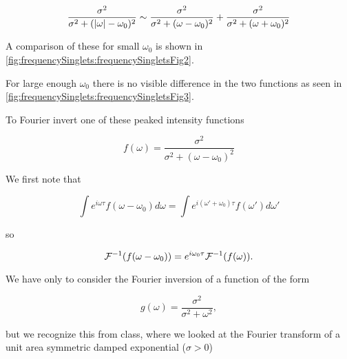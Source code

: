 {\begin{dmath}\label{eqn:modernOptics:problemSet3:1:240}
\frac{\sigma^2}
{
\sigma^2 + (\Abs{\omega} - \omega_0)^2
}
\sim
\frac{\sigma^2}
{
\sigma^2 + (\omega - \omega_0)^2
}
+
\frac{\sigma^2}
{
\sigma^2 + (\omega + \omega_0)^2
}
\end{dmath}

A comparison of these for small $\omega_0$ is shown in \cref{fig:frequencySinglets:frequencySingletsFig2}.


For large enough $\omega_0$ there is no visible difference in the two functions  as seen in \cref{fig:frequencySinglets:frequencySingletsFig3}.


To Fourier invert one of these peaked intensity functions

\begin{dmath}\label{eqn:modernOptics:problemSet3:1:260}
f(\omega) =
\frac{\sigma^2}
{
\sigma^2 + (\omega - \omega_0)^2
}
\end{dmath}

We first note that

\begin{dmath}\label{eqn:modernOptics:problemSet3:1:280}
\int e^{i \omega \tau} f(\omega - \omega_0) d\omega
=
\int e^{i (\omega' + \omega_0) \tau} f(\omega') d\omega'
\end{dmath}

so

\begin{dmath}\label{eqn:modernOptics:problemSet3:1:300}
\FF^{-1}(f(\omega - \omega_0)) = e^{i\omega_0 \tau} \FF^{-1} (f(\omega)).
\end{dmath}

We have only to consider the Fourier inversion of a function of the form

\begin{dmath}\label{eqn:modernOptics:problemSet3:1:320}
g(\omega) =
\frac{\sigma^2}
{
\sigma^2 + \omega^2
},
\end{dmath}

but we recognize this from class, where we looked at the Fourier transform of a unit area symmetric damped exponential ($\sigma > 0$)

}

